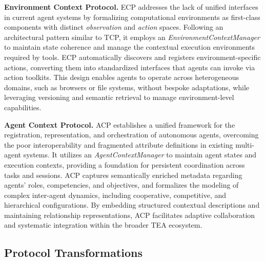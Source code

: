 \documentclass[11pt]{article}
\begin{document}
\textbf{Environment Context Protocol.} ECP addresses the lack of unified interfaces in current agent systems by formalizing computational environments as first-class components with distinct \textit{observation} and \textit{action} spaces. Following an architectural pattern similar to TCP, it employs an \textit{EnvironmentContextManager} to maintain state coherence and manage the contextual execution environments required by tools. ECP automatically discovers and registers environment-specific actions, converting them into standardized interfaces that agents can invoke via action toolkits. This design enables agents to operate across heterogeneous domains, such as browsers or file systems, without bespoke adaptations, while leveraging versioning and semantic retrieval to manage environment-level capabilities.

\textbf{Agent Context Protocol.} ACP establishes a unified framework for the registration, representation, and orchestration of autonomous agents, overcoming the poor interoperability and fragmented attribute definitions in existing multi-agent systems. It utilizes an \textit{AgentContextManager} to maintain agent states and execution contexts, providing a foundation for persistent coordination across tasks and sessions. ACP captures semantically enriched metadata regarding agents' roles, competencies, and objectives, and formalizes the modeling of complex inter-agent dynamics, including cooperative, competitive, and hierarchical configurations. By embedding structured contextual descriptions and maintaining relationship representations, ACP facilitates adaptive collaboration and systematic integration within the broader TEA ecosystem.

\subsection{Protocol Transformations}
\end{document}
